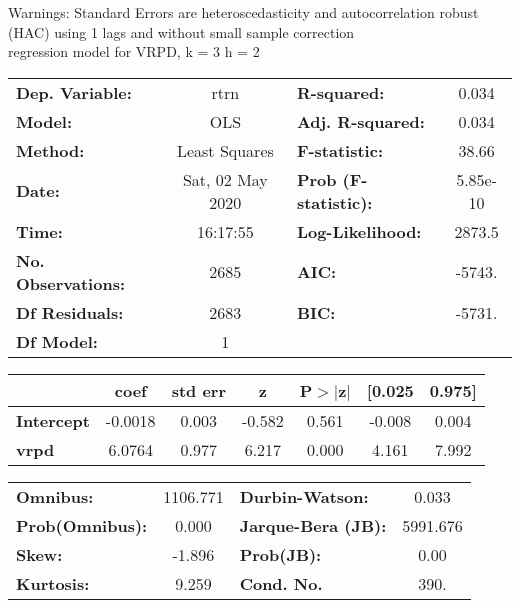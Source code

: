 Warnings: \newline
 [1] Standard Errors are heteroscedasticity and autocorrelation robust (HAC) using 1 lags and without small sample correction\\ 

regression model for VRPD, k = 3 h = 2\begin{center}
\begin{tabular}{lclc}
\toprule
\textbf{Dep. Variable:}    &       rtrn       & \textbf{  R-squared:         } &     0.034   \\
\textbf{Model:}            &       OLS        & \textbf{  Adj. R-squared:    } &     0.034   \\
\textbf{Method:}           &  Least Squares   & \textbf{  F-statistic:       } &     38.66   \\
\textbf{Date:}             & Sat, 02 May 2020 & \textbf{  Prob (F-statistic):} &  5.85e-10   \\
\textbf{Time:}             &     16:17:55     & \textbf{  Log-Likelihood:    } &    2873.5   \\
\textbf{No. Observations:} &        2685      & \textbf{  AIC:               } &    -5743.   \\
\textbf{Df Residuals:}     &        2683      & \textbf{  BIC:               } &    -5731.   \\
\textbf{Df Model:}         &           1      & \textbf{                     } &             \\
\bottomrule
\end{tabular}
\begin{tabular}{lcccccc}
                   & \textbf{coef} & \textbf{std err} & \textbf{z} & \textbf{P$> |$z$|$} & \textbf{[0.025} & \textbf{0.975]}  \\
\midrule
\textbf{Intercept} &      -0.0018  &        0.003     &    -0.582  &         0.561        &       -0.008    &        0.004     \\
\textbf{vrpd}      &       6.0764  &        0.977     &     6.217  &         0.000        &        4.161    &        7.992     \\
\bottomrule
\end{tabular}
\begin{tabular}{lclc}
\textbf{Omnibus:}       & 1106.771 & \textbf{  Durbin-Watson:     } &    0.033  \\
\textbf{Prob(Omnibus):} &   0.000  & \textbf{  Jarque-Bera (JB):  } & 5991.676  \\
\textbf{Skew:}          &  -1.896  & \textbf{  Prob(JB):          } &     0.00  \\
\textbf{Kurtosis:}      &   9.259  & \textbf{  Cond. No.          } &     390.  \\
\bottomrule
\end{tabular}
\end{center}

